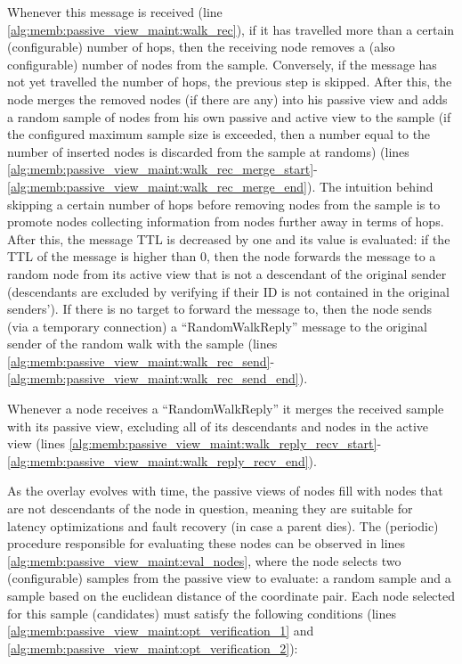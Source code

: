 

Whenever this message is received (line \ref{alg:memb:passive_view_maint:walk_rec}), if it has travelled more than a certain (configurable) number of hops, then the receiving node removes a (also configurable) number of nodes from the sample. Conversely, if the message has not yet travelled the number of hops, the previous step is skipped. After this, the node merges the removed nodes (if there are any) into his passive view and adds a random sample of nodes from his own passive and active view to the sample (if the configured maximum sample size is exceeded, then a number equal to the number of inserted nodes is discarded from the sample at randoms) (lines \ref{alg:memb:passive_view_maint:walk_rec_merge_start}-\ref{alg:memb:passive_view_maint:walk_rec_merge_end}). The intuition behind skipping a certain number of hops before removing nodes from the sample is to promote nodes collecting information from nodes further away in terms of hops. After this, the message TTL is decreased by one and its value is evaluated: if the TTL of the message is higher than 0, then the node forwards the message to a random node from its active view that is not a descendant of the original sender (descendants are excluded by verifying if their ID is not contained in the original senders'). If there is no target to forward the message to, then the node sends (via a temporary connection) a ``RandomWalkReply'' message to the original sender of the random walk with the sample (lines \ref{alg:memb:passive_view_maint:walk_rec_send}-\ref{alg:memb:passive_view_maint:walk_rec_send_end}). 

Whenever a node receives a ``RandomWalkReply'' it merges the received sample with its passive view, excluding all of its descendants and nodes in the active view (lines \ref{alg:memb:passive_view_maint:walk_reply_recv_start}-\ref{alg:memb:passive_view_maint:walk_reply_recv_end}).

As the overlay evolves with time, the passive views of nodes fill with nodes that are not descendants of the node in question, meaning they are suitable for latency optimizations and fault recovery (in case a parent dies). The (periodic) procedure responsible for evaluating these nodes can be observed in lines \ref{alg:memb:passive_view_maint:eval_nodes}, where the node selects two (configurable) samples from the passive view to evaluate: a random sample and a sample based on the euclidean distance of the coordinate pair. Each node selected for this sample (candidates) must satisfy the following conditions (lines \ref{alg:memb:passive_view_maint:opt_verification_1} and \ref{alg:memb:passive_view_maint:opt_verification_2}): 

